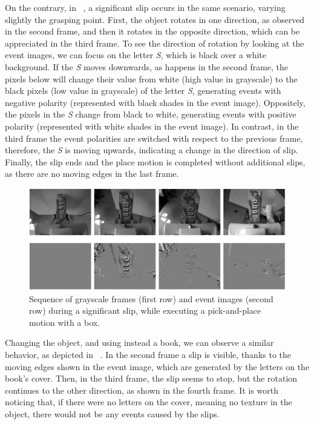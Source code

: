 On the contrary, in ~, a significant slip occurs in the same scenario, varying slightly the grasping point. First, the object rotates in one direction, as observed in the second frame, and then it rotates in the opposite direction, which can be appreciated in the third frame. To see the direction of rotation by looking at the event images, we can focus on the letter \textit{S}, which is black over a white background. If the \textit{S} moves downwards, as happens in the second frame, the pixels below will change their value from white (high value in grayscale) to the black pixels (low value in grayscale) of the letter \textit{S}, generating events with negative polarity (represented with black shades in the event image). Oppositely, the pixels in the \textit{S} change from black to white, generating events with positive polarity (represented with white shades in the event image). In contrast, in the third frame the event polarities are switched with respect to the previous frame, therefore, the \textit{S} is moving upwards, indicating a change in the direction of slip. Finally, the slip ends and the place motion is completed without additional slips, as there are no moving edges in the last frame.

\begin{figure}[H]
    \centering
    \includegraphics[width=\textwidth]{resources/images/set1_case2}
    \caption{Sequence of grayscale frames (first row) and event images (second row) during a significant slip, while executing a pick-and-place motion with a box.}\label{fig:set1_case2}
\end{figure}

Changing the object, and using instead a book, we can observe a similar behavior, as depicted in ~. In the second frame a slip is visible, thanks to the moving edges shown in the event image, which are generated by the letters on the book's cover. Then, in the third frame, the slip seems to stop, but the rotation continues to the other direction, as shown in the fourth frame. It is worth noticing that, if there were no letters on the cover, meaning no texture in the object, there would not be any events caused by the slips.\\

